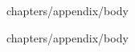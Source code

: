 \ifuniversity
\begin{appendix}
\appendixstartedtrue
{}
{}
{chapters/appendix/body}
\end{appendix}
\else
\appendix
\begin{appendices}
{chapters/appendix/body}
\end{appendices}
\fi
